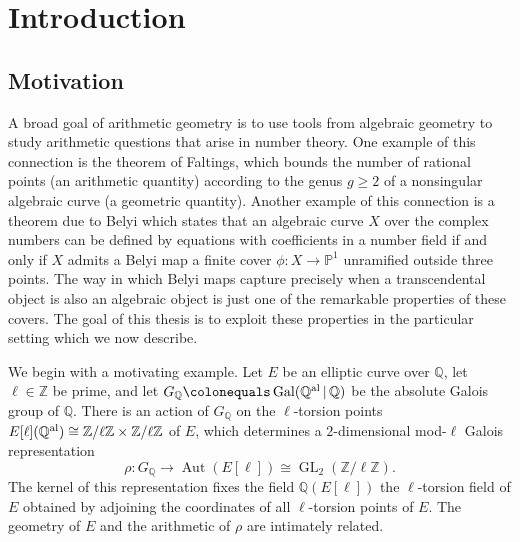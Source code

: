 \documentclass{dcthesis}
\newcommand{\PP}{\mathbb P}
\newcommand{\QQ}{\mathbb Q}
\newcommand{\ZZ}{\mathbb Z}
\newcommand{\defi}[1]{\textsf{#1}}
\newcommand{\QQal}{{\mathbb Q}^{\textup{al}}}
\DeclareMathOperator{\Aut}{Aut}
\DeclareMathOperator{\Gal}{Gal}
\DeclareMathOperator{\GL}{GL}
\numberwithin{equation}{section}
\theoremstyle{definition}
\theoremstyle{remark}
\begin{document}

\chapter{Introduction}{\label{chapter:intro}
  \section{Motivation}{\label{sec:motivation}{
    A broad goal of arithmetic geometry is
    to use tools from algebraic geometry
    to study arithmetic questions that arise
    in number theory.
    One example of this connection is
    the theorem of
    Faltings,
    which bounds
    the number of rational points
    (an arithmetic quantity)
    according to
    the genus $g \geq 2$
    of a nonsingular algebraic curve
    (a geometric quantity).
    Another example of this connection
    is a theorem due to Belyi
    which states that an algebraic curve
    $X$
    over the complex numbers
    can be defined by equations with
    coefficients in a number field
    if and only if
    $X$ admits a \defi{Belyi map}
    a finite cover $\phi\colon X\to\PP^1$
    unramified outside three points.
    The way in which Belyi maps
    capture precisely when a transcendental
    object is also an algebraic object
    is just one of the remarkable properties
    of these covers.
    The goal of this thesis is to exploit
    these properties in the
    particular setting which we
    now describe.
    \par
    We begin with a motivating example.
    Let $E$ be an elliptic curve over $\QQ$,
    let $\ell\in\ZZ$ be prime,
    and let $G_\QQ\colonequals\Gal(\QQal\,|\,\QQ)$
    be the absolute Galois group of $\QQ$.
    There is an action of $G_\QQ$ on the
    $\ell$-torsion points
    $E[\ell](\QQal)\cong\ZZ/\ell\ZZ\times
    \ZZ/\ell\ZZ$
    of $E$,
    which determines a $2$-dimensional
    mod-$\ell$ Galois representation
    \begin{equation}
      \label{eqn:modlgalois}
      \rho\colon
      G_\QQ\to
      \Aut(E[\ell])\cong
      \GL_2(\ZZ/\ell\ZZ).
    \end{equation}
    The kernel of this
    representation fixes the field
    $\QQ(E[\ell])$
    the
    $\ell$-torsion field of $E$
    obtained by adjoining the coordinates
    of all $\ell$-torsion points of $E$.
    The geometry of $E$ and the arithmetic
    of $\rho$ are intimately related.
}}}
\end{document}
